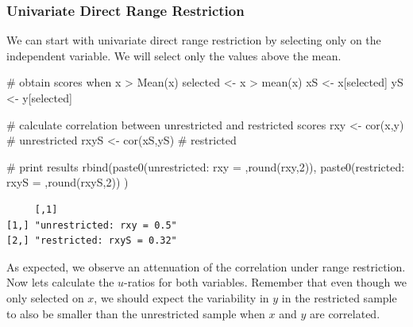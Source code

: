 \documentclass[
  letterpaper,
  DIV=11,
  numbers=noendperiod]{scrreprt}
\newenvironment{Shaded}{\begin{snugshade}}{\end{snugshade}}
\newcommand{\CommentTok}[1]{\textcolor[rgb]{0.37,0.37,0.37}{#1}}
\newcommand{\DecValTok}[1]{\textcolor[rgb]{0.68,0.00,0.00}{#1}}
\newcommand{\FunctionTok}[1]{\textcolor[rgb]{0.28,0.35,0.67}{#1}}
\newcommand{\NormalTok}[1]{\textcolor[rgb]{0.00,0.23,0.31}{#1}}
\newcommand{\OtherTok}[1]{\textcolor[rgb]{0.00,0.23,0.31}{#1}}
\newcommand{\SpecialCharTok}[1]{\textcolor[rgb]{0.37,0.37,0.37}{#1}}
\newcommand{\StringTok}[1]{\textcolor[rgb]{0.13,0.47,0.30}{#1}}
\begin{document}
\hypertarget{univariate-direct-range-restriction}{%
\subsubsection*{Univariate Direct Range
Restriction}\label{univariate-direct-range-restriction}}

We can start with univariate direct range restriction by selecting only
on the independent variable. We will select only the values above the
mean.

\begin{Shaded}
\begin{Highlighting}[]
\CommentTok{\# obtain scores when x \textgreater{} Mean(x)}
\NormalTok{selected }\OtherTok{\textless{}{-}}\NormalTok{ x }\SpecialCharTok{\textgreater{}} \FunctionTok{mean}\NormalTok{(x)}
\NormalTok{xS }\OtherTok{\textless{}{-}}\NormalTok{ x[selected]}
\NormalTok{yS }\OtherTok{\textless{}{-}}\NormalTok{ y[selected]}

\CommentTok{\# calculate correlation between unrestricted and restricted scores}
\NormalTok{rxy }\OtherTok{\textless{}{-}} \FunctionTok{cor}\NormalTok{(x,y) }\CommentTok{\# unrestricted}
\NormalTok{rxyS }\OtherTok{\textless{}{-}} \FunctionTok{cor}\NormalTok{(xS,yS) }\CommentTok{\# restricted}

\CommentTok{\# print results}
\FunctionTok{rbind}\NormalTok{(}\FunctionTok{paste0}\NormalTok{(}\StringTok{\textquotesingle{}unrestricted: rxy = \textquotesingle{}}\NormalTok{,}\FunctionTok{round}\NormalTok{(rxy,}\DecValTok{2}\NormalTok{)),}
      \FunctionTok{paste0}\NormalTok{(}\StringTok{\textquotesingle{}restricted: rxyS = \textquotesingle{}}\NormalTok{,}\FunctionTok{round}\NormalTok{(rxyS,}\DecValTok{2}\NormalTok{))}
\NormalTok{      )}
\end{Highlighting}
\end{Shaded}

\begin{verbatim}
     [,1]                     
[1,] "unrestricted: rxy = 0.5"
[2,] "restricted: rxyS = 0.32"
\end{verbatim}

As expected, we observe an attenuation of the correlation under range
restriction. Now lets calculate the \(u\)-ratios for both variables.
Remember that even though we only selected on \(x\), we should expect
the variability in \(y\) in the restricted sample to also be smaller
than the unrestricted sample when \(x\) and \(y\) are correlated.
\end{document}

